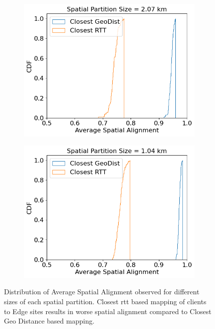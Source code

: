 \begin{figure}
\begin{subfigure}{0.45\textwidth}
  \centering
  \includegraphics[width=\linewidth]{figures/mechanisms/spatial_ctx_mgmt/spatial_alignment_randomized_16_rows.png}
  \caption{}
\end{subfigure}%
\begin{subfigure}{0.45\textwidth}
  \centering
  \includegraphics[width=\linewidth]{figures/mechanisms/spatial_ctx_mgmt/spatial_alignment_randomized_32_rows.png}
  \caption{}
\end{subfigure}
\caption{Distribution of Average Spatial Alignment observed for different sizes of each spatial partition. Closest \gls{rtt} based mapping of clients to Edge sites results in worse spatial alignment compared to Closest Geo Distance based mapping. }
\label{fig:spatial_alignment_eval}
\end{figure}

